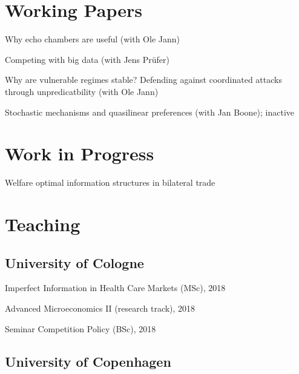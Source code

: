 \documentclass[a4paper]{article}
\renewenvironment{itemize}{
  \begin{list}{}{
    \setlength{\leftmargin}{1.5em}
  }
}{
  \end{list}
}
\begin{document}
\section*{Working Papers}

\begin{itemize}
\item Why echo chambers are useful (with Ole Jann)
  
\item Competing with big data (with Jens Pr\"ufer)

\item Why are vulnerable regimes stable? Defending against coordinated attacks through unpredicatbility (with Ole Jann)

\item Stochastic mechanisms and quasilinear preferences (with Jan Boone); inactive

\end{itemize}

 \section*{Work in Progress}

 \begin{itemize}
 \item Welfare optimal information structures in bilateral trade
 \end{itemize}

\section*{Teaching} 

\subsection*{University of Cologne}
\begin{itemize}
  \item Imperfect Information in Health Care Markets (MSc), 2018
\item Advanced Microeconomics II (research track), 2018
  \item Seminar Competition Policy (BSc), 2018
\end{itemize}

\subsection*{University of Copenhagen}
\end{document}
